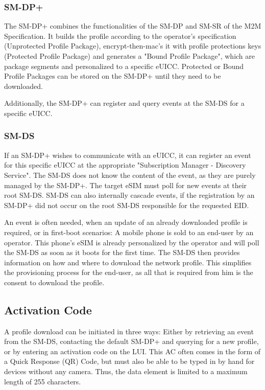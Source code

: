 \subsubsection{SM-DP+}
The SM-DP+ combines the functionalities of the SM-DP and SM-SR of the M2M Specification. It builds the profile according to the operator's specification (Unprotected Profile Package), encrypt-then-mac's it with profile protections keys (Protected Profile Package) and generates a "Bound Profile Package", which are package segments and personalized to a specific eUICC. Protected or Bound Profile Packages can be stored on the SM-DP+ until they need to be downloaded. 

Additionally, the SM-DP+ can register and query events at the SM-DS for a specific eUICC.

\subsubsection{SM-DS}
If an SM-DP+ wishes to communicate with an eUICC, it can register an event for this specific eUICC at the appropriate "Subscription Manager - Discovery Service". The SM-DS does not know the content of the event, as they are purely managed by the SM-DP+. The target eSIM must poll for new events at their root SM-DS. SM-DS can also internally cascade events, if the registration by an SM-DP+ did not occur on the root SM-DS responsible for the requested EID. 

An event is often needed, when an update of an already downloaded profile is required, or in first-boot scenarios: A mobile phone is sold to an end-user by an operator. This phone's eSIM is already personalized by the operator and will poll the SM-DS as soon as it boots for the first time. The SM-DS then provides information on how and where to download the network profile. This simplifies the provisioning process for the end-user, as all that is required from him is the consent to download the profile.

\subsection{Activation Code}
A profile download can be initiated in three ways: Either by retrieving an event from the SM-DS, contacting the default SM-DP+ and querying for a new profile, or by entering an activation code on the LUI.
This AC often comes in the form of a Quick Response (QR) Code, but must also be able to be typed in by hand for devices without any camera. Thus, the data element is limited to a maximum length of 255 characters. 

